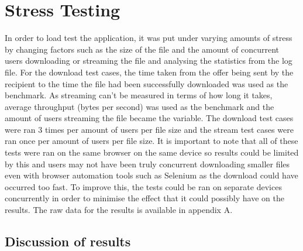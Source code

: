 \documentclass[]{report}
\begin{document}
		\section{Stress Testing}
		In order to load test the application, it was put under varying amounts of stress by changing factors such as the size of the file and the amount of concurrent users downloading or streaming the file and analysing the statistics from the log file. For the download test cases, the time taken from the offer being sent by the recipient to the time the file had been successfully downloaded was used as the benchmark. As streaming can't be measured in terms of how long it takes, average throughput (bytes per second) was used as the benchmark and the amount of users streaming the file became the variable. The download test cases were ran 3 times per amount of users per file size and the stream test cases were ran once per amount of users per file size. It is important to note that all of these tests were ran on the same browser on the same device so results could be limited by this and users may not have been truly concurrent downloading smaller files even with browser automation tools such as Selenium as the download could have occurred too fast. To improve this, the tests could be ran on separate devices concurrently in order to minimise the effect that it could possibly have on the results. The raw data for the results is available in appendix A.
		
		\subsection{Discussion of results}
\end{document}
